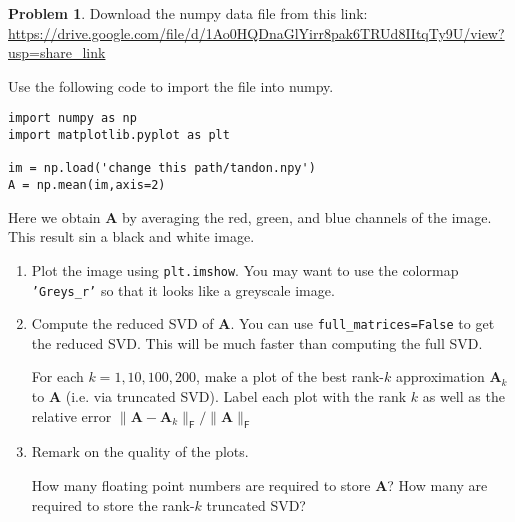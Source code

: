 \documentclass[12pt]{article}
\theoremstyle{definition}
\newtheorem{problem}{Problem}
\renewcommand{\vec}{\mathbf}
\newcommand{\F}{\mathsf{F}}
\begin{document}
\begin{problem}

    Download the numpy data file from this link:  \url{https://drive.google.com/file/d/1Ao0HQDnaGlYirr8pak6TRUd8IItqTy9U/view?usp=share_link}

Use the following code to import the file into numpy.

\begin{lstlisting}
import numpy as np
import matplotlib.pyplot as plt

im = np.load('change this path/tandon.npy')
A = np.mean(im,axis=2)
\end{lstlisting}

Here we obtain $\vec{A}$ by averaging the red, green, and blue channels of the image.
This result sin a black and white image.

    \begin{enumerate}
        \item Plot the image using \lstinline{plt.imshow}.
            You may want to use the colormap \texttt{'Greys\_r'} so that it looks like a greyscale image.
        \item
            Compute the reduced SVD of $\vec{A}$. 
            You can use \lstinline{full_matrices=False} to get the reduced SVD.
            This will be much faster than computing the full SVD.

            For each $k=1,10,100,200$, make a plot of the best rank-$k$ approximation $\vec{A}_k$ to $\vec{A}$ (i.e. via truncated SVD).
            Label each plot with the rank $k$ as well as the relative error $\| \vec{A} - \vec{A}_k \|_\F / \| \vec{A} \|_\F$
        \item 
            Remark on the quality of the plots. 
            
            How many floating point numbers are required to store $\vec{A}$?
            How many are required to store the rank-$k$ truncated SVD?
    \end{enumerate}

\end{problem}
\clearpage
\end{document}
